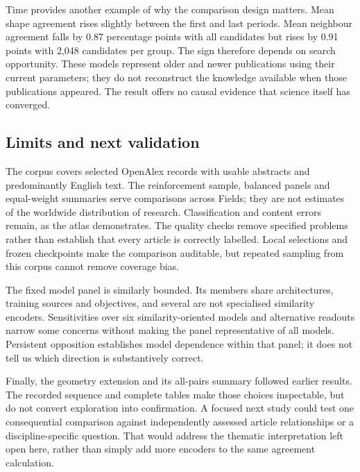 \documentclass[12pt]{article}
\begin{document}
Time provides another example of why the comparison design matters. Mean shape agreement rises slightly between the first and last periods. Mean neighbour agreement falls by 0.87 percentage points with all candidates but rises by 0.91 points with 2,048 candidates per group. The sign therefore depends on search opportunity. These models represent older and newer publications using their current parameters; they do not reconstruct the knowledge available when those publications appeared. The result offers no causal evidence that science itself has converged.

\subsection{Limits and next validation}
The corpus covers selected OpenAlex records with usable abstracts and predominantly English text. The reinforcement sample, balanced panels and equal-weight summaries serve comparisons across Fields; they are not estimates of the worldwide distribution of research. Classification and content errors remain, as the atlas demonstrates. The quality checks remove specified problems rather than establish that every article is correctly labelled. Local selections and frozen checkpoints make the comparison auditable, but repeated sampling from this corpus cannot remove coverage bias.

The fixed model panel is similarly bounded. Its members share architectures, training sources and objectives, and several are not specialised similarity encoders. Sensitivities over six similarity-oriented models and alternative readouts narrow some concerns without making the panel representative of all models. Persistent opposition establishes model dependence within that panel; it does not tell us which direction is substantively correct.

Finally, the geometry extension and its all-pairs summary followed earlier results. The recorded sequence and complete tables make those choices inspectable, but do not convert exploration into confirmation. A focused next study could test one consequential comparison against independently assessed article relationships or a discipline-specific question. That would address the thematic interpretation left open here, rather than simply add more encoders to the same agreement calculation.
\end{document}
